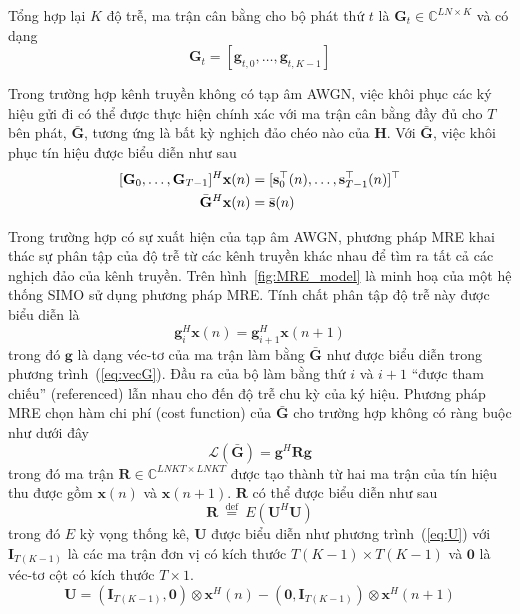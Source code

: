 Tổng hợp lại $K$ độ trễ, ma trận cân bằng cho bộ phát thứ $t$ là
 $\mathbf{G}_t \in \mathbb{C}^{LN \times K}$ và có dạng
\begin{equation}
    \mathbf{G}_t = [\mathbf{g}_{t, 0}, \ldots, \mathbf{g}_{t, K-1}]
\end{equation}

Trong trường hợp kênh truyền không có tạp âm AWGN, việc khôi phục các ký hiệu gửi đi có thể được thực hiện chính xác với ma trận cân bằng đầy đủ cho $T$ bên phát, $\bar{\mathbf{G}}$, tương ứng là bất kỳ nghịch đảo chéo nào của $\mathbf{H}$. Với $\bar{\mathbf{G}}$, việc khôi phục tín hiệu được biểu diễn như sau
\begin{equation}
    \begin{aligned}
        \relax[\mathbf{G}_0, \ldots, \mathbf{G}_{T-1}]^{H} 
        \mathbf{x}(n)
        &= [\mathbf{s}_0^\top(n), \ldots, \mathbf{s}^\top_{T-1}(n)]^\top \\
        \bar{\mathbf{G}}^H \mathbf{x}(n) &= \bar{\mathbf{s}}(n)
    \end{aligned}   
\end{equation}

Trong trường hợp có sự xuất hiện của tạp âm AWGN, phương pháp MRE khai thác sự phân tập của độ trễ từ các kênh truyền khác nhau để tìm ra tất cả các nghịch đảo của kênh truyền. Trên hình~\ref{fig:MRE_model} là minh hoạ của một hệ thống SIMO sử dụng phương pháp MRE.
Tính chất phân tập độ trễ này được biểu diễn là
\begin{equation}
\label{eq:contrant}
    \mathbf{g}_i^H \mathbf{x}(n) = \mathbf{g}_{i+1}^H \mathbf{x}(n+1)
\end{equation}
trong đó $\mathbf{g}$ là dạng véc-tơ của ma trận làm bằng $\bar{\mathbf{G}}$ như được biểu diễn trong phương trình~(\ref{eq:vecG}). Đầu ra của bộ làm bằng thứ $i$ và $i+1$ ``được tham chiếu'' (referenced) lẫn nhau cho đến độ trễ chu kỳ của ký hiệu. Phương pháp MRE chọn hàm chi phí (cost function) của $\bar{\mathbf{G}}$ cho trường hợp không có ràng buộc như dưới đây
\begin{equation}
\label{eq:loss_mre}
    \mathcal{L}(\bar{\mathbf{G}})=\mathbf{g}^H \mathbf{R} \mathbf{g}
\end{equation}
trong đó ma trận $\mathbf{R} \in \mathbb{C}^{LNKT \times LNKT}$ được tạo thành từ hai ma trận của tín hiệu thu được gồm $\mathbf{x}(n)$ và $\mathbf{x}(n+1)$. $\mathbf{R}$ có thể được biểu diễn như sau
\begin{equation}
\label{eq:R}
\mathbf{R} \stackrel{\text { def }}{=} \mathbf{\mathit{E}}\left(\mathbf{U}^{H} \mathbf{U}\right)
\end{equation}
trong đó $\mathbf{\mathit{E}}$ kỳ vọng thống kê, $\mathbf{U}$ được biểu diễn như phương trình~(\ref{eq:U}) với $\mathbf{I}_{T (K-1)}$ là các ma trận đơn vị có kích thước $T(K-1) \times T(K-1)$ và $\mathbf{0}$ là véc-tơ cột có kích thước $T \times 1$.
\begin{equation}
\label{eq:U}
\mathbf{U} = \left(\mathbf{I}_{T (K-1)}, \mathbf{0}\right) \otimes \mathbf{x}^{H}(n)-\left(\mathbf{0}, \mathbf{I}_{T (K-1)}\right) \otimes \mathbf{x}^{H}(n+1)
\end{equation}

